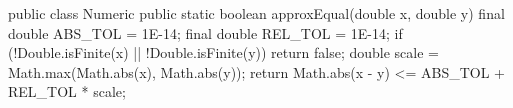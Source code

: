\begin{unipdcode}[language=Java]
public class Numeric {
    public static boolean approxEqual(double x, double y) {
        final double ABS_TOL = 1E-14;
        final double REL_TOL = 1E-14;
        if (!Double.isFinite(x) || !Double.isFinite(y)) {
            return false;
        }
        double scale = Math.max(Math.abs(x), Math.abs(y));
        return Math.abs(x - y) <= ABS_TOL + REL_TOL * scale;
    }
}
\end{unipdcode}
